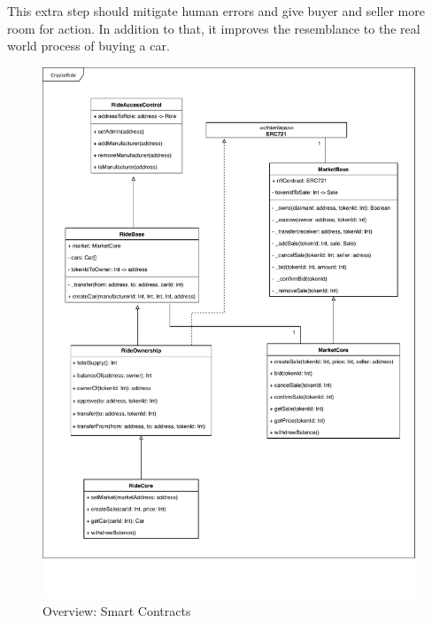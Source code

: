 This extra step should mitigate human errors and give buyer and seller more room for action. In addition to that, it improves the resemblance to the real world process of buying a car.

\begin{figure}[htbp]
\centerline{\includegraphics[width=\textwidth,height=\textheight,keepaspectratio]{figures/smart_contracts_uml.pdf}}
\caption{Overview: Smart Contracts \label{fig:class_diagram}}
\end{figure}



